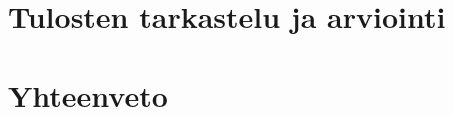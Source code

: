 \documentclass{config/tauthesis}
\numberwithin{equation}{section}
\theoremstyle{definition}
\begin{document}
\chapter{Tulosten tarkastelu ja arviointi} \label{ch:10_tulosten_tarkastelu_ja_arviointi}
  
\chapter{Yhteenveto} \label{ch:11_yhteenveto}
  
\printbibliography[heading=bibintoc]

\end{document}
